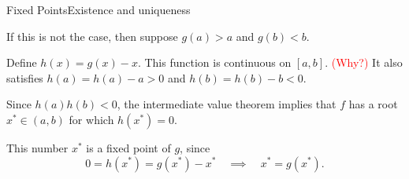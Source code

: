 \documentclass[12pt,aspectratio=169]{beamer}
\begin{document}
\begin{frame}{Fixed Points}{Existence and uniqueness}




  If this is not the case, then suppose $g(a) > a$ and $g(b) < b$.

  Define $h(x) = g(x) - x$.
  This function is continuous on $[a,b]$. \textcolor{red}{(Why?)}
  It also satisfies $h(a) = h(a) - a > 0$ and $h(b) = h(b) - b < 0$.

  Since $h(a)h(b) < 0$, the intermediate value theorem implies that $f$ has
  a root $x^* \in (a,b)$ for which $h(x^*) = 0$.

  This number $x^*$ is a fixed point of $g$, since
  \[
    0 = h(x^*) = g(x^*) - x^*
    \quad \implies \quad
    x^* = g(x^*).
  \]
\end{frame}
\end{document}
